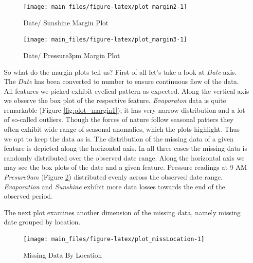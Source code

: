 \begin{Schunk}
\begin{figure}[H]

{\centering \texttt{[image: main\_files/figure-latex/plot\_margin2-1]} 

}

\caption[Date/ Sunshine Margin Plot]{Date/ Sunshine Margin Plot}\label{fig:plot_margin2}
\end{figure}
\end{Schunk}

\begin{Schunk}
\begin{figure}[H]

{\centering \texttt{[image: main\_files/figure-latex/plot\_margin3-1]} 

}

\caption[Date/ Pressure3pm Margin Plot]{Date/ Pressure3pm Margin Plot}\label{fig:plot_margin3}
\end{figure}
\end{Schunk}

So what do the margin plots tell us? First of all let's take a look at
\emph{Date} axis. The \emph{Date} has been converted to number to ensure
continuous flow of the data. All features we picked exhibit cyclical
pattern as expected. Along the vertical axis we observe the box plot of
the respective feature. \emph{Evaporaton} data is quite remarkable
(Figure \ref{fig:plot_margin1}); it has very narrow distribution and a
lot of so-called outliers. Though the forces of nature follow seasonal
patters they often exhibit wide range of seasonal anomalies, which the
plots highlight. Thus we opt to keep the data as is. The distribution of
the missing data of a given feature is depicted along the horizontal
axis. In all three cases the missing data is randomly distributed over
the observed date range. Along the horizontal axis we may see the box
plots of the date and a given feature. Pressure readings at 9 AM
\emph{Presure9am} (Figure \ref{fig:plot_margin3}) distributed evenly
across the observed date range. \emph{Evaporation} and \emph{Sunshine}
exhibit more data losses towards the end of the observed period.

The next plot examines another dimension of the missing data, namely
missing date grouped by location.

\begin{Schunk}
\begin{figure}[H]

{\centering \texttt{[image: main\_files/figure-latex/plot\_missLocation-1]} 

}

\caption[Missing Data By Location]{Missing Data By Location}\label{fig:plot_missLocation}
\end{figure}
\end{Schunk}


